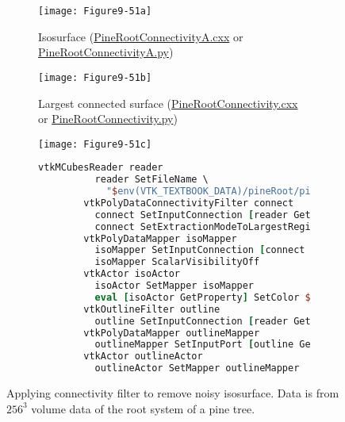\begin{figure}[htb]
    \centering
	\begin{subfigure}[h]{0.38\linewidth}
		\texttt{[image: Figure9-51a]}
		\captionsetup{justification=centering}
		\caption{Isosurface (\href{https://lorensen.github.io/VTKExamples/site/Cxx/VisualizationAlgorithms/PineRootConnectivityA/}{PineRootConnectivityA.cxx} or \href{https://lorensen.github.io/VTKExamples/site/Python/VisualizationAlgorithms/PineRootConnectivityA/}{PineRootConnectivityA.py})}
		\label{fig:Figure9-51a}
	\end{subfigure}
	\hfill
	\begin{subfigure}[h]{0.38\linewidth}
		\texttt{[image: Figure9-51b]}
		\captionsetup{justification=centering}
		\caption{Largest connected surface (\href{https://lorensen.github.io/VTKExamples/site/Cxx/VisualizationAlgorithms/PineRootConnectivity/}{PineRootConnectivity.cxx} or \href{https://lorensen.github.io/VTKExamples/site/Python/VisualizationAlgorithms/PineRootConnectivity/}{PineRootConnectivity.py})}
        \label{fig:Figure9-51b}
	\end{subfigure}
	\hfill
	\begin{subfigure}[h]{0.76\linewidth}
		\texttt{[image: Figure9-51c]}
		\captionsetup{justification=centering}
		\caption*{}
        \label{fig:Figure9-51c}
	\end{subfigure}
	\begin{subfigure}[h]{0.76\linewidth}
        \begin{lstlisting}[language=TCL,  caption={}, numbers=none, frame=none]
        vtkMCubesReader reader
          reader SetFileName \
            "$env(VTK_TEXTBOOK_DATA)/pineRoot/pine_root.tri"
        vtkPolyDataConnectivityFilter connect
          connect SetInputConnection [reader GetOutputPort]
          connect SetExtractionModeToLargestRegion
        vtkPolyDataMapper isoMapper
          isoMapper SetInputConnection [connect GetOutputPort]
          isoMapper ScalarVisibilityOff
        vtkActor isoActor
          isoActor SetMapper isoMapper
          eval [isoActor GetProperty] SetColor $raw_sienna
        vtkOutlineFilter outline
          outline SetInputConnection [reader GetOutputPort]
        vtkPolyDataMapper outlineMapper
          outlineMapper SetInputPort [outline GetOutputPort]
        vtkActor outlineActor
          outlineActor SetMapper outlineMapper
        \end{lstlisting}
        \label{fig:Figure9-51d}
	\end{subfigure}
	\caption{Applying connectivity filter to remove noisy isosurface. Data is from $256^3$ volume data of the root system of a pine tree.}\label{fig:Figure9-51}
\end{figure}

